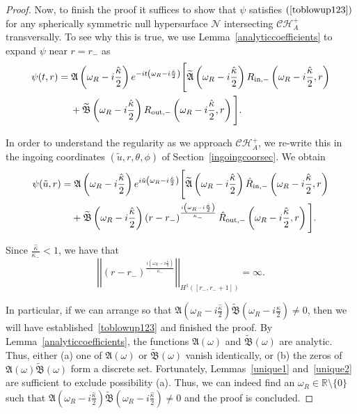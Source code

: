 \documentclass[A4,10pt]{article}
\begin{document}
\begin{proof}
Now, to finish the proof it suffices to show that  $\psi$ satisfies 
$(\ref{toblowup123})$
for any spherically symmetric null hypersurface $\mathcal{N}$ intersecting $\mathcal{CH}^+_A$ transversally.  To see why this is true,  we use Lemma~\ref{analyticcoefficients} to expand $\psi$ near $r=r_-$ as
\begin{align*}
&\psi(t,r) = \mathfrak A\left(\omega_R-i\frac{\hat{\kappa}}{2}\right)e^{-it\left(\omega_R -i\frac{\hat{\kappa}}{2}\right)}\Bigg[\mathfrak{\widetilde{A}}\left(\omega_R-i\frac{\hat{\kappa}}{2}\right)R_{{\rm in},-}\left(\omega_R-i\frac{\hat{\kappa}}{2},r\right) \\ \nonumber &\qquad\qquad + \mathfrak{\widetilde{B}}\left(\omega_R-i\frac{\hat{\kappa}}{2}\right)R_{{\rm out},-}\left(\omega_R-i\frac{\hat{\kappa}}{2},r\right) \Bigg].
\end{align*}

In order to understand the regularity as we approach $\mathcal{CH}^+_A$, we re-write this in 
the ingoing coordinates $(\tilde u,r,\theta,\phi)$ of Section~\ref{ingoingcoorsec}. We obtain
\begin{align*}
&\psi(\tilde u,r) = \mathfrak A\left(\omega_R-i\frac{\hat{\kappa}}{2}\right)e^{i\tilde u\left(\omega_R -i\frac{\hat{\kappa}}{2}\right)}\Bigg[\mathfrak{\widetilde{A}}\left(\omega_R-i\frac{\hat{\kappa}}{2}\right)\hat{R}_{{\rm in},-}\left(\omega_R-i\frac{\hat{\kappa}}{2},r\right) 
\\ \nonumber &\qquad \qquad + \mathfrak{\widetilde{B}}\left(\omega_R-i\frac{\hat{\kappa}}{2}\right)\left(r-r_-\right)^{\frac{i\left(\omega_R - i\frac{\hat{\kappa}}{2}\right)}{\kappa_-}}\hat{R}_{{\rm out},-}\left(\omega_R-i\frac{\hat{\kappa}}{2},r\right) \Bigg].
\end{align*}

Since $\frac{\hat{\kappa}}{\kappa_-} < 1$, we have that 
\[\left\vert\left\vert \left(r-r_-\right)^{\frac{i\left(\omega_R - i\frac{\hat{\kappa}}{2}\right)}{\kappa_-}}\right\vert\right\vert_{H^1\left([r_-,r_-+1]\right)} = \infty.\]

In particular, if we can arrange so that $\mathfrak{A}\left(\omega_R-i\frac{\hat{\kappa}}{2}\right)\mathfrak{\widetilde B}\left(\omega_R-i\frac{\hat{\kappa}}{2}\right) \neq 0$, then we will have established~\eqref{toblowup123} and finished the proof. By Lemma~\ref{analyticcoefficients}, the functions $\mathfrak{A}\left(\omega\right)$ and $\mathfrak{\widetilde B}(\omega)$ are analytic. Thus, either (a) one of $\mathfrak{A}(\omega)$ or $\mathfrak{\widetilde B}(\omega)$ vanish identically, or 
(b) the zeros of $\mathfrak{A}(\omega)\mathfrak{\widetilde B}(\omega)$ form a discrete set. Fortunately, Lemmas~\ref{unique1} and~\ref{unique2} are sufficient to exclude possibility (a).  
Thus, we can indeed find an $\omega_R \in \mathbb{R}\setminus \{0\}$ such that $\mathfrak{A}\left(\omega_R-i\frac{\hat{\kappa}}{2}\right)\mathfrak{\widetilde B}\left(\omega_R-i\frac{\hat{\kappa}}{2}\right) \neq 0$ and the proof is concluded.


\end{proof}
\end{document}
